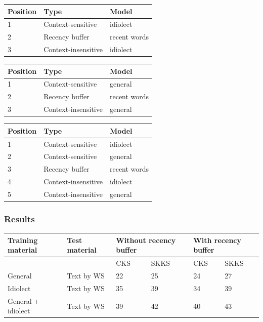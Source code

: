 \documentclass[12pt]{article}
\let\originaltable\table
\let\endoriginaltable\endtable
\renewenvironment{table}[1][ht]{%
  \originaltable[#1]
  \centering}%
  {\endoriginaltable}
\begin{document}
\begin{table}[H]
\begin{tabular}{lll} 
Position&Type&Model\\
\hline
1&Context-sensitive&idiolect\\
2&Recency buffer&recent words\\
3&Context-insensitive&idiolect\\
\end{tabular} 
\caption{The module order for simulation 1, with the idiolect model and the recency buffer} 
\end{table}

\begin{table}[H]
\begin{tabular}{lll} 
Position&Type&Model\\
\hline
1&Context-sensitive&general\\
2&Recency buffer&recent words\\
3&Context-insensitive&general\\
\end{tabular} 
\caption{The module order for simulation 2, with the general model and the recency buffer} 
\end{table}

\begin{table}[H]
\begin{tabular}{lll} 
Position&Type&Model\\
\hline
1&Context-sensitive&idiolect\\
2&Context-sensitive&general\\
3&Recency buffer&recent words\\
4&Context-insensitive&idiolect\\
5&Context-insensitive&general\\
\end{tabular} 
\caption{The module order for simulation 3, with the idiolect model, the general model and the recency buffer} \label{sim3}
\end{table}


\subsubsection{Results} 

\begin{table}[H] 
\centering
\begin{tabular}{ll|llll} 
Training material&Test material&\multicolumn{2}{l}{Without recency buffer}&\multicolumn{2}{l}{With recency buffer}\\
\hline
&&CKS&SKKS&CKS&SKKS\\
General&Text by WS&22&25&24&27\\
Idiolect&Text by WS&35&39&34&39\\
General + idiolect&Text by WS&39&42&40&43\\
\end{tabular} 
\caption{Percentage of keystrokes that can be saved with and without the recency buffer} \label{recbuf_results}
\end{table}
\end{document}
